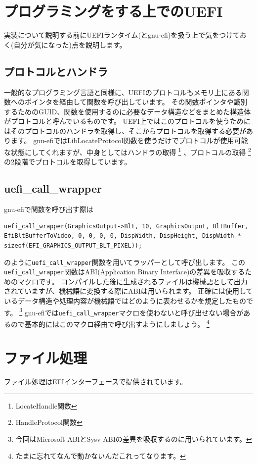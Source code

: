 \documentclass[10pt,b5paper,twoside,openany]{ltjsbook}
\begin{document}
\section{プログラミングをする上でのUEFI}
実装について説明する前にUEFIランタイム(とgnu-efi)を扱う上で気をつけておく(自分が気になった)点を説明します。
\subsection{プロトコルとハンドラ}
一般的なプログラミング言語と同様に、UEFIのプロトコルもメモリ上にある関数へのポインタを経由して関数を呼び出しています。
その関数ポインタや識別するためのGUID、関数を使用するのに必要なデータ構造などをまとめた構造体がプロトコルと呼んでいるものです。
UEFI上ではこのプロトコルを使うためにはそのプロトコルのハンドラを取得し、そこからプロトコルを取得する必要があります。
gnu-efiではLibLocateProtocol関数を使うだけでプロトコルが使用可能な状態にしてくれますが、中身としてはハンドラの取得
\footnote{LocateHandle関数}
、プロトコルの取得
\footnote{HandleProtocol関数}
の2段階でプロトコルを取得しています。

\subsection{uefi\_call\_wrapper}
gnu-efiで関数を呼び出す際は
\begin{lstlisting}[caption=call function with gnu-efi,label=cfgnuefi]
uefi_call_wrapper(GraphicsOutput->Blt, 10, GraphicsOutput, BltBuffer, EfiBltBufferToVideo, 0, 0, 0, 0, DispWidth, DispHeight, DispWidth * sizeof(EFI_GRAPHICS_OUTPUT_BLT_PIXEL));
\end{lstlisting}
のように\verb+uefi_call_wrapper+関数を用いてラッパーとして呼び出します。
この\verb+uefi_call_wrapper+関数はABI(Application Binary Interface)の差異を吸収するためのマクロです。
コンパイルした後に生成されるファイルは機械語として出力されていますが、機械語に変換する際にABIは用いられます。
正確には使用しているデータ構造や処理内容が機械語ではどのように表わせるかを規定したものです。
\footnote{今回はMicrosoft ABIとSysv ABIの差異を吸収するのに用いられています。}
gnu-efiでは\verb+uefi_call_wrapper+マクロを使わないと呼び出せない場合があるので基本的にはこのマクロ経由で呼び出すようにしましょう。
\footnote{たまに忘れてなんで動かないんだこれってなります。}

\section{ファイル処理}
ファイル処理はEFIインターフェースで提供されています。
\end{document}
